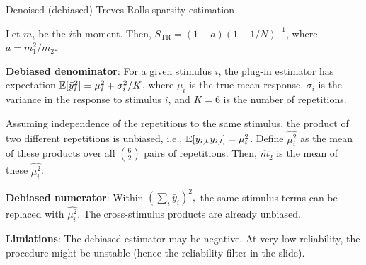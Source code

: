 \documentclass[aspectratio=169, handout]{beamer}
\begin{document}
\begin{frame}{Denoised (debiased) Treves-Rolls sparsity estimation}

Let \( m_i \) be the \( i \)th moment. Then, \( S_{\textrm{TR}} = (1 - a) (1 - 1 / N)^{-1}\), where \( a = m_1^2 / m_2 \). 

\textbf{Debiased denominator}: For a given stimulus \( i \), the plug-in estimator has expectation \( \mathbb{E} [ \bar y_i^2 ] = \mu_i^2 + \sigma_i^2 / K \), where \( \mu_i \) is the true mean response, \( \sigma_i \) is the variance in the response to stimulus \( i \), and \( K = 6 \) is the number of repetitions. 

Assuming independence of the repetitions to the same stimulus, the product of two different repetitions is unbiased, i.e., \( \mathbb{E}[y_{i, k} y_{i, l}] = \mu_i^2 \). Define \( \widehat{\mu_i^2} \) as the mean of these products over all \( \binom{6}{2} \) pairs of repetitions. Then, \( \hat m_2 \) is the mean of these \( \widehat{\mu_i^2} \). 

\textbf{Debiased numerator}: Within \( \left( \sum_i \bar y_i \right)^2, \) the same-stimulus terms can be replaced with \( \widehat{\mu_i^2} \). The cross-stimulus products are already unbiased.

\textbf{Limiations}: The debiased estimator may be negative. At very low reliability, the procedure might be unstable (hence the reliability filter in the slide). 
\end{frame}
\end{document}
